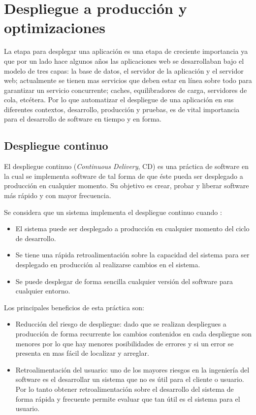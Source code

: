 \chapter{Despliegue a producción y optimizaciones}

La etapa para desplegar una aplicación es una etapa de creciente importancia ya
que por un lado hace algunos años las aplicaciones web se desarrollaban bajo el
modelo de tres capas: la base de datos, el servidor de la aplicación y el servidor
web; actualmente se tienen mas servicios que deben estar en línea sobre todo para
garantizar un servicio concurrente; caches, equilibradores de carga, servidores
de cola, etcétera. Por lo que automatizar el despliegue de una aplicación en sus
diferentes contextos, desarrollo, producción y pruebas, es de vital importancia
para el desarrollo de software en tiempo y en forma.

\section{Despliegue continuo}

El despliegue continuo (\textit{Continuous Delivery}, CD) es una práctica de software
en la cual se implementa software de tal forma de que éste pueda ser desplegado a
producción en cualquier momento\cite{27_martin_fowler_cd}. Su objetivo es crear,
probar y liberar software más rápido y con mayor frecuencia.

\vspace{2.5mm}

Se considera que un sistema implementa el despliegue continuo cuando
\cite{27_martin_fowler_cd}:
\begin{itemize}
\item El sistema puede ser desplegado a producción en cualquier momento del
  ciclo de desarrollo.
\item Se tiene una rápida retroalimentación sobre la capacidad del sistema
  para ser desplegado en producción al realizarse cambios en el sistema.
\item Se puede desplegar de forma sencilla cualquier versión del software para
  cualquier entorno.
\end{itemize}

Los principales beneficios de esta práctica son:
\begin{itemize}
\item Reducción del riesgo de despliegue: dado que se realizan despliegues
  a producción de forma recurrente los cambios contenidos en cada despliegue
  son menores por lo que hay menores posibilidades de errores y si un error
  se presenta en mas fácil de localizar y arreglar.
\item Retroalimentación del usuario: uno de los mayores riesgos en la ingeniería
  del software es el desarrollar un sistema que no es útil para el cliente o usuario.
  Por lo tanto obtener retroalimentación sobre el desarrollo del sistema de forma
  rápida y frecuente permite evaluar que tan útil es el sistema para el usuario.
\end{itemize}

